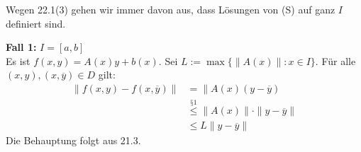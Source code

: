 \documentclass[a4paper,twoside,DIV15,BCOR12mm,chapterprefix=true,headings=twolinechapter]{scrbook}
\begin{document}
\begin{wichtigebemerkung}
Wegen 22.1(3) gehen wir immer davon aus, dass Lösungen von (S) auf ganz $I$ definiert sind.
\end{wichtigebemerkung}

\begin{beweise}
\item \textbf{Fall 1:} $I=[a,b]$\\
Es ist $f(x,y)=A(x)y+b(x)$. Sei $L:=\max\{\|A(x)\|:x\in I\}$. Für alle $(x,y),(x,\overline y)\in D$ gilt:
\begin{align*}
\|f(x,y)-f(x,\overline y) \| &=\|A(x)(y-\overline y)\\
&\stackrel{\text{§1}}{\le} \|A(x)\|\cdot\|y-\overline y\|\\
&\le L\|y-\overline y\|
\end{align*}
Die Behauptung folgt aus 21.3.


\end{beweise}
\end{document}
